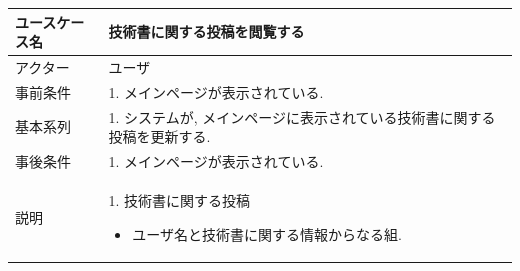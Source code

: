 \documentclass[dvipdfmx]{jsarticle}
\begin{document}
    \newpage

    \begin{table}[H]
        \begin{tabular}{|l|l|} \hline
            ユースケース名 & 技術書に関する投稿を閲覧する          \\ \hline
            アクター    & ユーザ                 \\ \hline
            事前条件    &   1. メインページが表示されている.  \\ \hline
            基本系列    & 1. システムが, メインページに表示されている技術書に関する投稿を更新する. \\\hline
            事後条件    &   1. メインページが表示されている.
            \\ \hline
            説明      & 
            \begin{minipage}{130mm} 
                \vspace{4truept}
                1. 技術書に関する投稿
                \begin{itemize}
                    \item ユーザ名と技術書に関する情報からなる組.
                \end{itemize}
                \vspace{4truept}
            \end{minipage}
            
            \\ \hline
        \end{tabular}
    \end{table}

    \newpage
\end{document}
